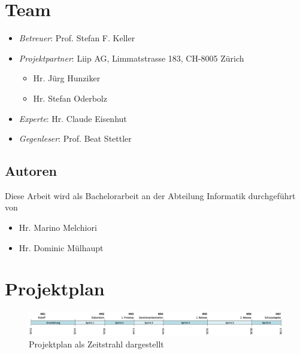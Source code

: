 \section{Team}
\label{pm-rollen}
\begin{itemize}
	\item \textit{Betreuer}: Prof. Stefan F. Keller
	\item \textit{Projektpartner}: Liip AG, Limmatstrasse 183, CH-8005 Zürich
	\begin{itemize}
		\item Hr. Jürg Hunziker
		\item Hr. Stefan Oderbolz
	\end{itemize}
	\item \textit{Experte}: Hr. Claude Eisenhut
	\item \textit{Gegenleser}: Prof. Beat Stettler
\end{itemize}

\subsection*{Autoren}
Diese Arbeit wird als Bachelorarbeit an der Abteilung Informatik durchgeführt von
\begin{itemize}
	\item Hr. Marino Melchiori
	\item Hr. Dominic Mülhaupt
\end{itemize}




\section{Projektplan}

\begin{figure}[H]
	\centering
	\includegraphics[width=\textwidth]{images/projektmanagement/zeitstrahl.png}
	\caption{Projektplan als Zeitstrahl dargestellt}
	\label{image-project-plan-timeline}
\end{figure}

